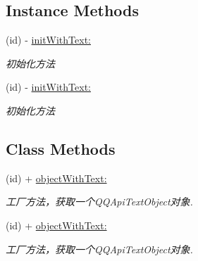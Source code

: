\subsection*{Instance Methods}
\begin{DoxyCompactItemize}
\item 
\mbox{\label{interface_q_q_api_text_object_ac755c9cf1b9fa986fd0e0d4510a0647c}} 
(id) -\/ \mbox{\hyperlink{interface_q_q_api_text_object_ac755c9cf1b9fa986fd0e0d4510a0647c}{init\+With\+Text\+:}}
\begin{DoxyCompactList}\small\item\em 初始化方法 \end{DoxyCompactList}\item 
\mbox{\label{interface_q_q_api_text_object_ac755c9cf1b9fa986fd0e0d4510a0647c}} 
(id) -\/ \mbox{\hyperlink{interface_q_q_api_text_object_ac755c9cf1b9fa986fd0e0d4510a0647c}{init\+With\+Text\+:}}
\begin{DoxyCompactList}\small\item\em 初始化方法 \end{DoxyCompactList}\end{DoxyCompactItemize}
\subsection*{Class Methods}
\begin{DoxyCompactItemize}
\item 
\mbox{\label{interface_q_q_api_text_object_ae081b2e9d23efabaf90234f1f1532c09}} 
(id) + \mbox{\hyperlink{interface_q_q_api_text_object_ae081b2e9d23efabaf90234f1f1532c09}{object\+With\+Text\+:}}
\begin{DoxyCompactList}\small\item\em 工厂方法，获取一个\+Q\+Q\+Api\+Text\+Object对象. \end{DoxyCompactList}\item 
\mbox{\label{interface_q_q_api_text_object_ae081b2e9d23efabaf90234f1f1532c09}} 
(id) + \mbox{\hyperlink{interface_q_q_api_text_object_ae081b2e9d23efabaf90234f1f1532c09}{object\+With\+Text\+:}}
\begin{DoxyCompactList}\small\item\em 工厂方法，获取一个\+Q\+Q\+Api\+Text\+Object对象. \end{DoxyCompactList}\end{DoxyCompactItemize}
